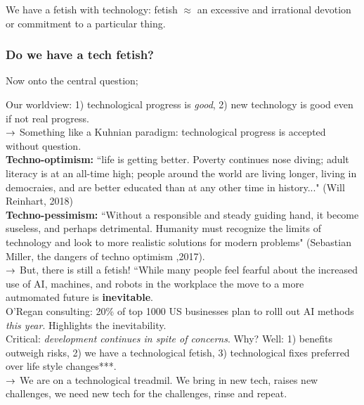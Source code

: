 We have a fetish with technology: fetish $\approx$ an excessive and irrational devotion or commitment to a particular thing.

\subsubsection{Do we have a tech fetish?}

Now onto the central question;


Our worldview: 1) technological progress is {\it good}, 2) new technology is good even if not real progress. \\

$\rightarrow$ Something like a Kuhnian paradigm: technological progress is accepted without question. \\

{\bf Techno-optimism:} ``life is getting better. Poverty continues nose diving; adult literacy is at an all-time high; people around the world are living longer, living in democraies, and are better educated than at any other time in history..." (Will Reinhart, 2018) \\

{\bf Techno-pessimism:} ``Without a responsible and steady guiding hand, it become suseless, and perhaps detrimental. Humanity must recognize the limits of technology and look to more realistic solutions for modern problems" (Sebastian Miller, the dangers of techno optimism ,2017). \\

$\rightarrow$ But, there is still a fetish! ``While many people feel fearful about the increased use of AI, machines, and robots in the workplace the move to a more autmomated future is {\bf inevitable}. \\

O'Regan consulting: 20\% of top 1000 US businesses plan to rolll out AI methods {\it this year}. Highlights the inevitability. \\

Critical: {\it development continues in spite of concerns}. Why? Well: 1) benefits outweigh risks, 2) we have a technological fetish, 3) technological fixes preferred over life style changes***. \\

$\rightarrow$ We are on a technological treadmil. We bring in new tech, raises new challenges, we need new tech for the challenges, rinse and repeat. \\




